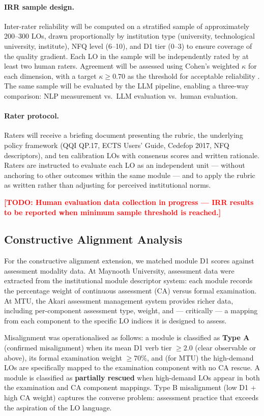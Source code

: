 \documentclass[12pt, a4paper]{article}
\newcommand{\todo}[1]{\textcolor{red}{\textbf{[TODO: #1]}}}
\begin{document}
\paragraph{IRR sample design.}
Inter-rater reliability will be computed on a stratified sample of approximately
200--300 LOs, drawn proportionally by institution type (university, technological
university, institute), NFQ level (6--10), and D1 tier (0--3) to ensure coverage
of the quality gradient. Each LO in the sample will be independently rated by at
least two human raters. Agreement will be assessed using Cohen's weighted $\kappa$
for each dimension, with a target $\kappa \geq 0.70$ as the threshold for acceptable
reliability \citep{landis1977measurement}. The same sample will be evaluated by the
LLM pipeline, enabling a three-way comparison: NLP measurement vs.\ LLM evaluation
vs.\ human evaluation.

\paragraph{Rater protocol.}
Raters will receive a briefing document presenting the rubric, the underlying policy
framework (QQI QP.17, ECTS Users' Guide, Cedefop 2017, NFQ descriptors), and ten
calibration LOs with consensus scores and written rationale. Raters are instructed
to evaluate each LO as an independent unit --- without anchoring to other outcomes
within the same module --- and to apply the rubric as written rather than adjusting
for perceived institutional norms.

\todo{Human evaluation data collection in progress --- IRR results to be reported
when minimum sample threshold is reached.}

\subsection{Constructive Alignment Analysis}

For the constructive alignment extension, we matched module D1 scores against
assessment modality data. At Maynooth University, assessment data were extracted
from the institutional module descriptor system: each module records the percentage
weight of continuous assessment (CA) versus formal examination. At MTU, the Akari
assessment management system provides richer data, including per-component
assessment type, weight, and --- critically --- a mapping from each component to the
specific LO indices it is designed to assess.

Misalignment was operationalised as follows: a module is classified as \textbf{Type A}
(confirmed misalignment) when its mean D1 verb tier $\geq 2.0$ (clear observable or
above), its formal examination weight $\geq 70\%$, and (for MTU) the high-demand LOs
are specifically mapped to the examination component with no CA rescue. A module is
classified as \textbf{partially rescued} when high-demand LOs appear in both the
examination and CA component mappings. Type B misalignment (low D1 + high CA weight)
captures the converse problem: assessment practice that exceeds the aspiration of
the LO language.
\end{document}
